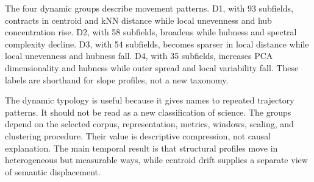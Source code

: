 The four dynamic groups describe movement patterns. D1, with 93 subfields, contracts in centroid and kNN distance while local unevenness and hub concentration rise. D2, with 58 subfields, broadens while hubness and spectral complexity decline. D3, with 54 subfields, becomes sparser in local distance while local unevenness and hubness fall. D4, with 35 subfields, increases PCA dimensionality and hubness while outer spread and local variability fall. These labels are shorthand for slope profiles, not a new taxonomy.

The dynamic typology is useful because it gives names to repeated trajectory patterns. It should not be read as a new classification of science. The groups depend on the selected corpus, representation, metrics, windows, scaling, and clustering procedure. Their value is descriptive compression, not causal explanation. The main temporal result is that structural profiles move in heterogeneous but measurable ways, while centroid drift supplies a separate view of semantic displacement.
